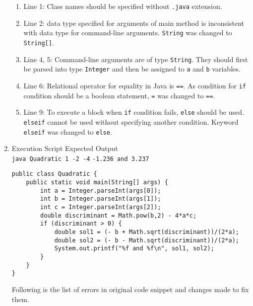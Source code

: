 \documentclass[12pt,letterpaper,twoside]{article}
\begin{document}
\begin{enumerate}[label=\textbf{(\alph*)}]
\begin{enumerate}[label=\arabic*.]
\item Line 1: Class names should be specified without \texttt{.java} extension.
\item Line 2: data type specified for arguments of main method is inconsistent with data type for command-line arguments. \texttt{String} was changed to \texttt{String[]}.
\item Line 4, 5: Command-line arguments are of type \texttt{String}. They should first be parsed into type \texttt{Integer} and then be assigned to \texttt{a} and \texttt{b} variables.
\item Line 6: Relational operator for equality in Java is \texttt{==}. As condition for \texttt{if} condition should be a boolean statement, \texttt{=} was changed to \texttt{==}.
\item Line 9: To execute a block when \texttt{if} condition fails, \texttt{else} should be used. \texttt{elseif} cannot be used without specifying another condition. Keyword \texttt{elseif} was changed to \texttt{else}.
\end{enumerate}

\item Execution Script \hfill Expected Output\\
\texttt{java Quadratic 1 -2 -4} \hfill \texttt{-1.236 and 3.237}

\begin{lstlisting}
public class Quadratic {
	public static void main(String[] args) {
		int a = Integer.parseInt(args[0]);
		int b = Integer.parseInt(args[1]);
		int c = Integer.parseInt(args[2]);
		double discriminant = Math.pow(b,2) - 4*a*c;
		if (discriminant > 0) {
			double sol1 = (- b + Math.sqrt(discriminant))/(2*a);
			double sol2 = (- b - Math.sqrt(discriminant))/(2*a);
			System.out.printf("%f and %f\n", sol1, sol2);
		}
	}
}
\end{lstlisting}

Following is the list of errors in original code snippet and changes made to fix them.


\end{enumerate}
\end{document}
